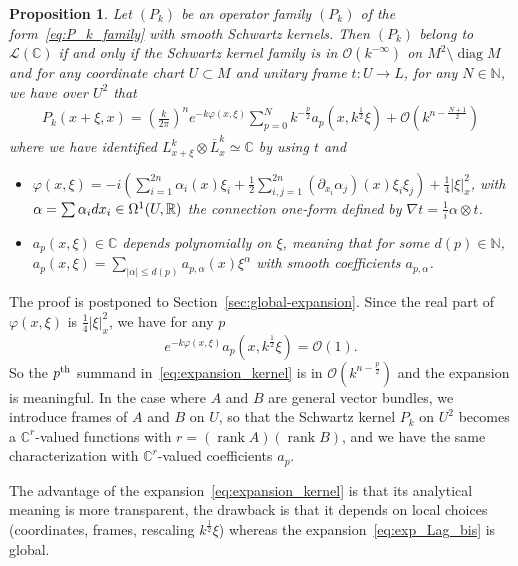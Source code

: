 \documentclass[10pt,a4paper]{article}
\newtheorem{prop}[theo]{Proposition}
\theoremstyle{definition}
\numberwithin{equation}{section}
\newcommand{\R}{{\mathbb{R}}}
\newcommand{\N}{{\mathbb{N}}}
\newcommand{\C}{{\mathbb{C}}}
\newcommand{\al}{{\alpha}}
\newcommand{\Om}{\Omega}
\newcommand{\con}{\overline}
\newcommand{\op}{\operatorname}
\newcommand{\bigo}{\mathcal{O}}
\newcommand{\lag}{\mathcal{L}}
\begin{document}
\begin{prop}\label{prop:un_de_plus}
Let $(P_k)$ be an operator family $(P_k)$ of the form~\eqref{eq:P_k_family} with smooth Schwartz kernels. Then $(P_k)$ belong to $\lag (\C)$ if and only if the Schwartz kernel family is in $\bigo (k^{-\infty})$ on $M^2
\setminus \op{diag} M$ and for any coordinate chart $U \subset M$ and unitary frame $t : U \rightarrow L$, for any $N \in \N$, we have over $U^2$ that
\begin{gather}\label{eq:expansion_kernel}
P_k (x + \xi, x) = \left(\frac{k}{2\pi} \right)^n e^{- k\varphi (x, \xi) }
\sum_{p =0 }^{N} k^{- \frac{p}{2}} a_{p} \left(x, k^{\frac{1}{2}} \xi \right) + \bigo \left(k^{n - \frac{N+1}{2}} \right)
\end{gather}
where we have identified $L_{x+\xi}^k \otimes \con{L}_{x}^k \simeq \C$ by using $t$ and
\begin{itemize}
\item[-] $\varphi(x, \xi) = - i (\sum_{i=1}^{2n} \al_i (x)\xi_i + \frac{1}{2}\sum_{i,j=1}^{2n} (\partial_{x_i}\al_j)(x) \xi_i \xi_j) + \frac{1}{4} |\xi|_x^2 $, with $\al =
\sum \al_i dx_i \linebreak\in \Om^1 (U, \R)$ the connection one-form defined by $\nabla t = \frac{1}{i} \al \otimes t$.
\item[-] $a_{p} (x,\xi) \in \C$ depends polynomially on $\xi$, meaning that for some $d(p) \in \N$, $a_p (x,\xi) =
\sum_{|\al |\leqslant d(p)} a_{p,\al} (x) \xi^\al$ with smooth coefficients $a_{p, \al}$.
\end{itemize}
\end{prop}

The proof is postponed to Section~\ref{sec:global-expansion}. Since the real part of $\varphi (x,\xi)$ is $\frac{1}{4} |\xi|_x^2$, we have for any $p$
\[
e^{-k \varphi (x, \xi)} a_p \left(x, k^\frac{1}{2} \xi \right) = \bigo
(1).
\]
So the $p^{\rm th}$ summand in~\eqref{eq:expansion_kernel} is in $\bigo (k^{n -\frac{p}{2}})$ and the expansion is meaningful. In the case where $A$ and $B$ are general vector bundles, we introduce frames of $A$ and $B$ on $U$, so that the Schwartz kernel $P_k$ on $U^2$ becomes a $\C^r$-valued functions with $r =(\op{rank} A)(\op{rank} B)$, and we have the same characterization with $\C^r$-valued coefficients $a_p$.


The advantage of the expansion~\eqref{eq:expansion_kernel} is that its analytical meaning is more transparent, the drawback is that it depends on local choices (coordinates, frames, rescaling $k^{\frac{1}{2}} \xi$) whereas the expansion~\eqref{eq:exp_Lag_bis} is global.
\end{document}
